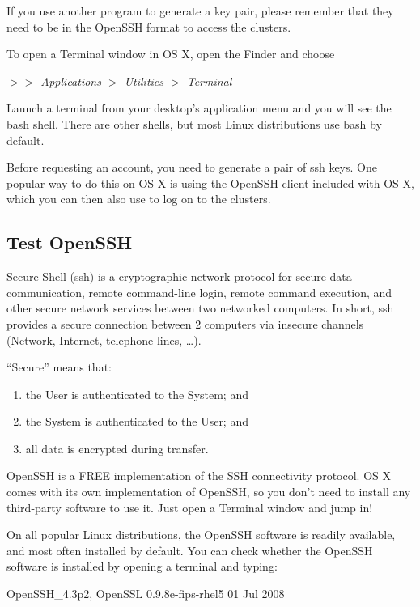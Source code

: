   If you use another program to generate a key pair, please remember that they
  need to be in the OpenSSH format to access the \hpc clusters.
\fi %

\ifmac
  To open a Terminal window in OS X, open the Finder and choose

  \emph{$>$$>$ Applications $>$ Utilities $>$ Terminal}
\fi

\iflinux
  Launch a terminal from your desktop's application menu and you will see the
  bash shell.
  There are other shells, but most Linux distributions use bash by default.
\fi

\ifmacORlinux
  Before requesting an account, you need to generate a pair of ssh keys. One
  popular way to do this on OS X is using the OpenSSH client included with OS
  X, which you can then also use to log on to the clusters.

  \subsection{Test OpenSSH}
  \label{sec:test-openssh}

  Secure Shell (ssh) is a cryptographic network protocol for secure data
  communication, remote command-line login, remote command execution, and other
  secure network services between two networked computers. In short, ssh
  provides a secure connection between 2 computers via insecure channels
  (Network, Internet, telephone lines, \ldots).

  ``Secure'' means that:
  \begin{enumerate}
    \item  the User is authenticated to the System; and
    \item  the System is authenticated to the User; and
    \item  all data is encrypted during transfer.
  \end{enumerate}

  OpenSSH is a FREE implementation of the SSH connectivity protocol. OS X comes
  with its own implementation of OpenSSH, so you don't need to install any
  third-party software to use it. Just open a Terminal window and jump in!

  On all popular Linux distributions, the OpenSSH software is readily
  available, and most often installed by default. You can check whether the
  OpenSSH software is installed by opening a terminal and typing:

\begin{prompt}
OpenSSH_4.3p2, OpenSSL 0.9.8e-fips-rhel5 01 Jul 2008
\end{prompt}

